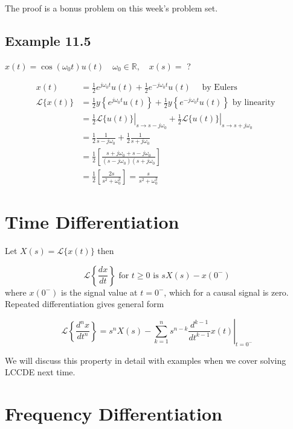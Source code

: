 \documentclass{article}
\begin{document}
The proof is a bonus problem on this week's problem set.

\subsection{Example 11.5}

$x(t)=\cos \left(\omega_{0} t\right) u(t) \quad \omega_{0} \in \mathbb{R}, \quad x(s)=$ ?

$$
\begin{aligned}
x(t) & =\frac{1}{2} e^{j \omega_{0} t} u(t)+\frac{1}{2} e^{-j \omega_{0} t} u(t) \quad \text { by Eulers } \\
\mathcal{L}\{x(t)\} & =\frac{1}{2} y\left\{e^{j \omega_{0} t} u(t)\right\}+\frac{1}{2} y\left\{e^{-j \omega_{0} t} u(t)\right\} \text { by linearity } \\
& =\left.\frac{1}{2} \mathcal{L}\{u(t)\}\right|_{s \rightarrow s-j \omega_{0}}+\left.\frac{1}{2} \mathcal{L}\{u(t)\}\right|_{s \rightarrow s + j\omega_{0}} \\
& =\frac{1}{2} \frac{1}{s-j \omega_{0}}+\frac{1}{2} \frac{1}{s+j \omega_{0}} \\
& =\frac{1}{2}\left[\frac{s+j \omega_{0}+s-j \omega_{0}}{\left(s-j \omega_{0}\right)\left(s+j \omega_{0}\right.}\right] \\
& =\frac{1}{2}\left[\frac{2 s}{s^{2}+\omega_{0}^{2}}\right]=\frac{s}{s^{2}+\omega_{0}^{2}}
\end{aligned}
$$

\section{Time Differentiation}

Let $X(s)=\mathcal{L}\{x(t)\}$ then

$$
\mathcal{L}\left\{\frac{d x}{d t}\right\} \text { for } t \geq 0 \text { is } s X(s)-x\left(0^{-}\right)
$$
where $x\left(0^{-}\right)$ is the signal value at $t=0^{-}$, which for a causal signal is zero. Repeated differentiation gives general form

$$
\mathcal{L}\left\{\frac{d^{n} x}{d t^{n}}\right\}=\left. s^{n} X(s)-\sum\limits_{k=1}^{n} s^{n-k} \frac{d^{k-1}}{d t^{k-1}} x(t) \right|_{t=0^{-}}
$$

We will discuss this property in detail with examples when we cover solving LCCDE next time.

\section{Frequency Differentiation}
\end{document}
